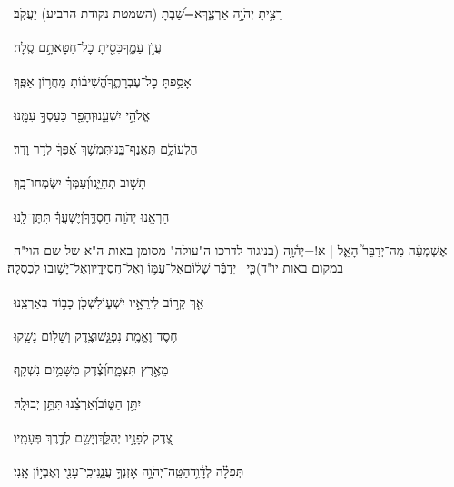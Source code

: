 \documentclass[12pt]{article}
\newcommand{\loc}[1]{\textsuperscript{\locf{#1}}}
\begin{document}
{\loc{ ב}~}‏רָצִ֣יתָ יְהֹוָ֣ה אַרְצֶ֑ךָ{\hfill}א=שַׁ֝בְתָּ (השמטת נקודת הרביע)  יַעֲקֹֽב׃\par

{\loc{ ג}~}‏ עֲוֺ֣ן עַמֶּ֑ךָ{\hfill}כִּסִּ֖יתָ כׇל־חַטָּאתָ֣ם סֶֽלָה׃\par

{\loc{ ד}~}‏אָסַ֥פְתָּ כׇל־עֶבְרָתֶ֑ךָ{\hfill}הֱ֝שִׁיב֗וֹתָ מֵחֲר֥וֹן אַפֶּֽךָ׃\par

{\loc{ ה}~}‏ אֱלֹהֵ֣י יִשְׁעֵ֑נוּ{\hfill}וְהָפֵ֖ר כַּעַסְךָ֣ עִמָּֽנוּ׃\par

{\loc{ ו}~}‏הַלְעוֹלָ֥ם תֶּאֱנַף־בָּ֑נוּ{\hfill}תִּמְשֹׁ֥ךְ אַ֝פְּךָ֗ לְדֹ֣ר וָדֹֽר׃\par

{\loc{ ז}~}‏ תָּשׁ֣וּב תְּחַיֵּ֑נוּ{\hfill}וְ֝עַמְּךָ֗ יִשְׂמְחוּ־בָֽךְ׃\par

{\loc{ ח}~}‏הַרְאֵ֣נוּ יְהֹוָ֣ה חַסְדֶּ֑ךָ{\hfill}וְ֝יֶשְׁעֲךָ֗ תִּתֶּן־לָֽנוּ׃\par

{\loc{ ט}~}‏אֶשְׁמְעָ֗ה מַה־יְדַבֵּר֮ הָאֵ֢ל | א!=יְה֫וָ֥ה (בניגוד לדרכו ה"עולה" מסומן באות ה"א של שם הוי"ה במקום באות יו"ד){\hfill}כִּ֤י |  יְדַבֵּ֬ר שָׁל֗וֹם\newline\hspace*{.5em}אֶל־עַמּ֥וֹ וְאֶל־חֲסִידָ֑יו{\hfill}וְאַל־יָשׁ֥וּבוּ לְכִסְלָֽה׃\par

{\loc{ י}~}‏אַ֤ךְ קָר֣וֹב לִירֵאָ֣יו יִשְׁע֑וֹ{\hfill}לִשְׁכֹּ֖ן כָּב֣וֹד בְּאַרְצֵֽנוּ׃\par

{\loc{ יא}~}‏חֶסֶד־וֶאֱמֶ֥ת נִפְגָּ֑שׁוּ{\hfill}צֶ֖דֶק וְשָׁל֣וֹם נָשָֽׁקוּ׃\par

{\loc{ יב}~}‏ מֵאֶ֣רֶץ תִּצְמָ֑ח{\hfill}וְ֝צֶ֗דֶק מִשָּׁמַ֥יִם נִשְׁקָֽף׃\par

{\loc{ יג}~}‏ יִתֵּ֣ן הַטּ֑וֹב{\hfill}וְ֝אַרְצֵ֗נוּ תִּתֵּ֥ן יְבוּלָֽהּ׃\par

{\loc{ יד}~}‏צֶ֭דֶק לְפָנָ֣יו יְהַלֵּ֑ךְ{\hfill}וְיָשֵׂ֖ם לְדֶ֣רֶךְ פְּעָמָֽיו׃\par\pend
\ledpb
\pstart[\subsection*{\textcolor{red}{פרק פו}}]\label{פרק פו}
{\loc{ א}~}‏תְּפִלָּ֗ה לְדָ֫וִ֥ד\newline\hspace*{.5em}הַטֵּֽה־יְהֹוָ֣ה אׇזְנְךָ֣ עֲנֵ֑נִי{\hfill}כִּֽי־עָנִ֖י וְאֶבְי֣וֹן אָֽנִי׃\par
\end{document}

